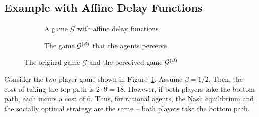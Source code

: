 \documentclass[twoside]{article}
\begin{document}
\begin{multicols}{2}
\section{Example with Affine Delay Functions}
\begin{figure}[H]
  \centering
  \begin{subfigure}[b]{\linewidth}
    \centering
    \caption{A game $\mathcal{G}$ with affine delay functions}
    \label{fig:affine}
  \end{subfigure}

  \begin{subfigure}[b]{\linewidth}
    \centering
    \caption{The game $\mathcal{G}^{(\beta)}$ that the agents perceive}
    \label{fig:affinebet}
  \end{subfigure}
  \caption{The original game $\mathcal{G}$ and the perceived game
  $\mathcal{G}^{(\beta)}$}
\end{figure}
Consider the two-player game shown in Figure~\ref{fig:affine}. Assume $\beta =
1/2$. Then, the cost of taking the top path is $2 \cdot 9 = 18$. However, if
both players take the bottom path, each incurs a cost of 6. Thus, for rational
agents, the Nash equilibrium and the socially optimal strategy are the same --
both players take the bottom path.


\end{multicols}
\end{document}
